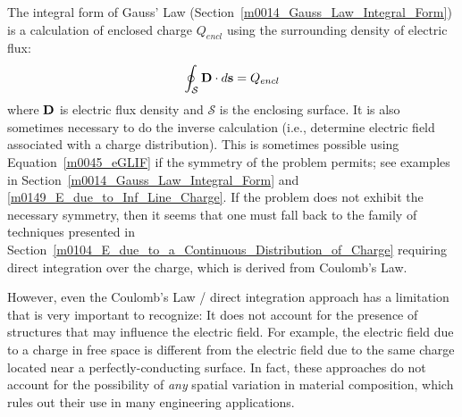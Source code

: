 

\label{m0045_Gauss_Law_Differential_Form_from_Integral_Form} %

The integral form of Gauss' Law (Section~\ref{m0014_Gauss_Law_Integral_Form}) is a calculation of enclosed charge $Q_{encl}$ using the surrounding density of electric flux:
%
\begin{equation}
\oint_{\mathcal S} {\bf D}\cdot d{\bf s} = Q_{encl}
\label{m0045_eGLIF}
\end{equation}
%
where ${\bf D}$ is electric flux density and ${\mathcal S}$ is the enclosing surface.
It is also sometimes necessary to do the inverse calculation (i.e., determine electric field associated with a charge distribution).
This is sometimes possible using Equation~\ref{m0045_eGLIF} if the symmetry of the problem permits; see examples in Section~\ref{m0014_Gauss_Law_Integral_Form} and \ref{m0149_E_due_to_Inf_Line_Charge}.
If the problem does not exhibit the necessary symmetry, then it seems that one must fall back to the family of techniques presented in Section~\ref{m0104_E_due_to_a_Continuous_Distribution_of_Charge} requiring direct integration over the charge, which is derived from Coulomb's Law.

However, even the Coulomb's Law / direct integration approach has a limitation that is very important to recognize: 
It does not account for the presence of structures that may influence the electric field. 
For example, the electric field due to a charge in free space is different from the electric field due to the same charge located near a perfectly-conducting surface.  
In fact, these approaches do not account for the possibility of \emph{any} spatial variation in material composition, which rules out their use in many engineering applications.

